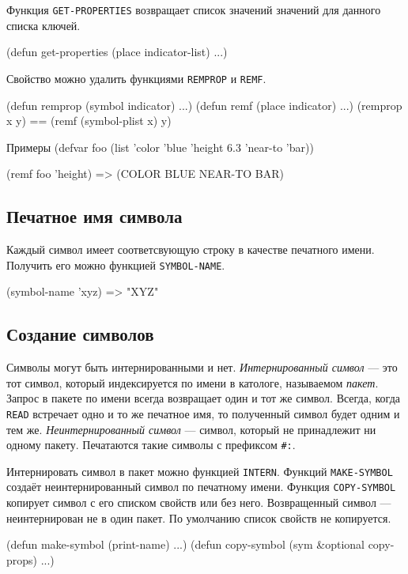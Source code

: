 Функция \lstinline{GET-PROPERTIES} возвращает список значений значений для данного списка ключей.
\begin{cllst}{}{}
(defun get-properties (place indicator-list) ...)
\end{cllst}

Свойство можно удалить функциями \lstinline{REMPROP} и \lstinline{REMF}.
\begin{cllst}{}{}
(defun remprop (symbol indicator) ...)
(defun remf (place indicator) ...)
(remprop x y) == (remf (symbol-plist x) y)
\end{cllst}

\begin{cllst}{Примеры}{}
(defvar foo (list 'color 'blue 'height 6.3 'near-to 'bar))

(remf foo 'height) => (COLOR BLUE NEAR-TO BAR)
\end{cllst}

\subsection{Печатное имя символа}
Каждый символ имеет соответсвующую строку в качестве печатного имени. Получить его можно функцией \lstinline{SYMBOL-NAME}.
\begin{cllst}{}{}
(symbol-name 'xyz) => "XYZ"
\end{cllst}

\subsection{Создание символов}
Символы могут быть интернированными и нет. \emph{Интернированный символ} — это тот символ, который индексируется по имени в катологе, называемом \emph{пакет}. Запрос в пакете по имени всегда возвращает один и тот же символ. Всегда, когда \lstinline{READ} встречает одно и то же печатное имя, то полученный символ будет одним и тем же. \emph{Неинтернированный символ} — символ, который не принадлежит ни одному пакету. Печатаются такие символы с префиксом \lstinline{#:}.

Интернировать символ в пакет можно функцией \lstinline{INTERN}. Функций \lstinline{MAKE-SYMBOL} создаёт неинтернированный символ по печатному имени. Функция \lstinline{COPY-SYMBOL} копирует символ с его списком свойств или без него. Возвращенный символ — неинтернирован не в один пакет. По умолчанию список свойств не копируется.
\begin{cllst}{}{}
(defun make-symbol (print-name) ...)
(defun copy-symbol (sym &optional copy-props) ...)
\end{cllst}

